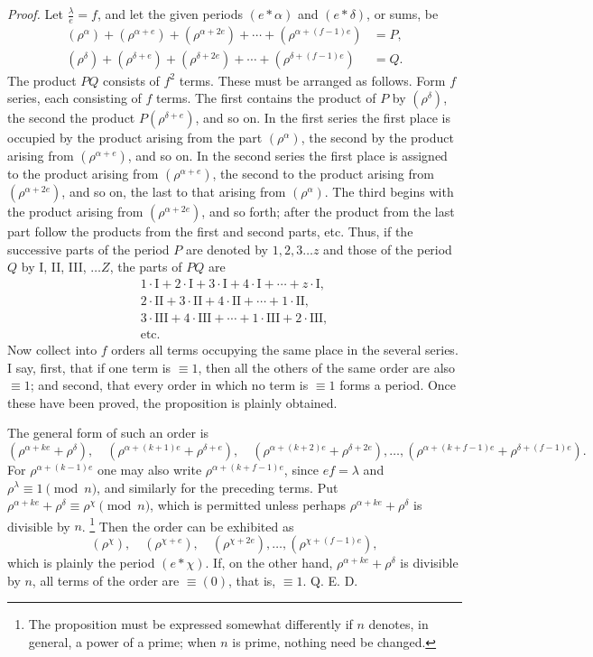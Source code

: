 \documentclass[12pt]{article}
\begin{document}
\textit{Proof.} Let $\frac{\lambda}{e}=f$, and let the given periods $(e*\alpha)$ and $(e*\delta)$, or sums, be
\[
\begin{aligned}
(\rho^\alpha)+(\rho^{\alpha+e})+(\rho^{\alpha+2e})+\cdots+(\rho^{\alpha+(f-1)e})&=P,\\
(\rho^\delta)+(\rho^{\delta+e})+(\rho^{\delta+2e})+\cdots+(\rho^{\delta+(f-1)e})&=Q.
\end{aligned}
\]
The product $PQ$ consists of $f^2$ terms. These must be arranged as follows. Form $f$ series, each consisting of $f$ terms. The first contains the product of $P$ by $(\rho^\delta)$, the second the product $P(\rho^{\delta+e})$, and so on. In the first series the first place is occupied by the product arising from the part $(\rho^\alpha)$, the second by the product arising from $(\rho^{\alpha+e})$, and so on. In the second series the first place is assigned to the product arising from $(\rho^{\alpha+e})$, the second to the product arising from $(\rho^{\alpha+2e})$, and so on, the last to that arising from $(\rho^\alpha)$. The third begins with the product arising from $(\rho^{\alpha+2e})$, and so forth; after the product from the last part follow the products from the first and second parts, etc. Thus, if the successive parts of the period $P$ are denoted by $1,2,3\ldots z$ and those of the period $Q$ by I, II, III, $\ldots Z$, the parts of $PQ$ are
\[
\begin{array}{l}
1\cdot\mathrm{I}+2\cdot\mathrm{I}+3\cdot\mathrm{I}+4\cdot\mathrm{I}+\cdots+z\cdot\mathrm{I},\\
2\cdot\mathrm{II}+3\cdot\mathrm{II}+4\cdot\mathrm{II}+\cdots+1\cdot\mathrm{II},\\
3\cdot\mathrm{III}+4\cdot\mathrm{III}+\cdots+1\cdot\mathrm{III}+2\cdot\mathrm{III},\\
\text{etc.}
\end{array}
\]
Now collect into $f$ orders all terms occupying the same place in the several series. I say, first, that if one term is $\equiv 1$, then all the others of the same order are also $\equiv 1$; and second, that every order in which no term is $\equiv 1$ forms a period. Once these have been proved, the proposition is plainly obtained.

The general form of such an order is
\[
(\rho^{\alpha+ke}+\rho^\delta),\quad (\rho^{\alpha+(k+1)e}+\rho^{\delta+e}),\quad (\rho^{\alpha+(k+2)e}+\rho^{\delta+2e}),\ldots, (\rho^{\alpha+(k+f-1)e}+\rho^{\delta+(f-1)e}).
\]
For $\rho^{\alpha+(k-1)e}$ one may also write $\rho^{\alpha+(k+f-1)e}$, since $ef=\lambda$ and $\rho^\lambda\equiv 1\pmod n$, and similarly for the preceding terms. Put $\rho^{\alpha+ke}+\rho^\delta\equiv \rho^\chi\pmod n$, which is permitted unless perhaps $\rho^{\alpha+ke}+\rho^\delta$ is divisible by $n$.
\footnote{The proposition must be expressed somewhat differently if $n$ denotes, in general, a power of a prime; when $n$ is prime, nothing need be changed.}
Then the order can be exhibited as
\[
(\rho^\chi),\quad (\rho^{\chi+e}),\quad (\rho^{\chi+2e}),\ldots,(\rho^{\chi+(f-1)e}),
\]
which is plainly the period $(e*\chi)$. If, on the other hand, $\rho^{\alpha+ke}+\rho^\delta$ is divisible by $n$, all terms of the order are $\equiv(0)$, that is, $\equiv 1$. Q. E. D.
\end{document}
